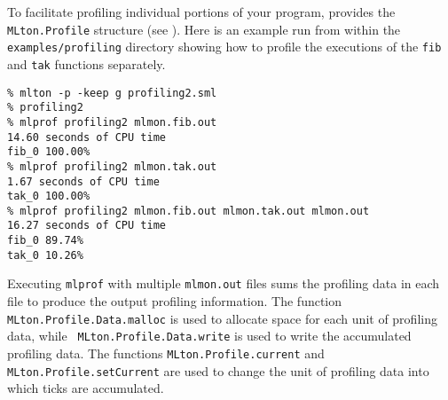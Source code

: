 To facilitate profiling individual portions of your program, {\mlton}
provides the {\tt MLton.Profile} structure (see ).
Here is an example run from within the {\tt examples/profiling}
directory showing how to profile the executions of the {\tt fib} and
{\tt tak} functions separately.

\begin{verbatim}
% mlton -p -keep g profiling2.sml
% profiling2
% mlprof profiling2 mlmon.fib.out
14.60 seconds of CPU time
fib_0 100.00%
% mlprof profiling2 mlmon.tak.out
1.67 seconds of CPU time
tak_0 100.00%
% mlprof profiling2 mlmon.fib.out mlmon.tak.out mlmon.out
16.27 seconds of CPU time
fib_0 89.74%
tak_0 10.26%
\end{verbatim}

Executing {\tt mlprof} with multiple {\tt mlmon.out} files sums the
profiling data in each file to produce the output profiling
information.  The function {\tt MLton.Profile.Data.malloc} is used to
allocate space for each unit of profiling data, while {\tt
  MLton.Profile.Data.write} is used to write the accumulated profiling
data.  The functions {\tt MLton.Profile.current} and {\tt
  MLton.Profile.setCurrent} are used to change the unit of profiling
data into which ticks are accumulated.

